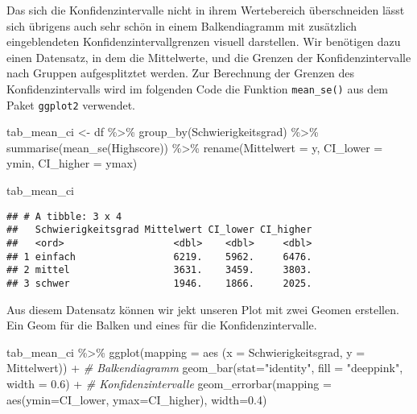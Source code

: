 \documentclass[
]{book}
\newenvironment{Shaded}{\begin{snugshade}}{\end{snugshade}}
\newcommand{\AttributeTok}[1]{\textcolor[rgb]{0.77,0.63,0.00}{#1}}
\newcommand{\CommentTok}[1]{\textcolor[rgb]{0.56,0.35,0.01}{\textit{#1}}}
\newcommand{\FloatTok}[1]{\textcolor[rgb]{0.00,0.00,0.81}{#1}}
\newcommand{\FunctionTok}[1]{\textcolor[rgb]{0.00,0.00,0.00}{#1}}
\newcommand{\NormalTok}[1]{#1}
\newcommand{\OtherTok}[1]{\textcolor[rgb]{0.56,0.35,0.01}{#1}}
\newcommand{\SpecialCharTok}[1]{\textcolor[rgb]{0.00,0.00,0.00}{#1}}
\newcommand{\StringTok}[1]{\textcolor[rgb]{0.31,0.60,0.02}{#1}}
\begin{document}
Das sich die Konfidenzintervalle nicht in ihrem Wertebereich überschneiden lässt sich übrigens auch sehr schön in einem Balkendiagramm mit zusätzlich eingeblendeten Konfidenzintervallgrenzen visuell darstellen. Wir benötigen dazu einen Datensatz, in dem die Mittelwerte, und die Grenzen der Konfidenzintervalle nach Gruppen aufgesplitztet werden. Zur Berechnung der Grenzen des Konfidenzintervalls wird im folgenden Code die Funktion \texttt{mean\_se()} aus dem Paket \texttt{ggplot2} verwendet.

\begin{Shaded}
\begin{Highlighting}[]
\NormalTok{tab\_mean\_ci }\OtherTok{\textless{}{-}}\NormalTok{ df }\SpecialCharTok{\%\textgreater{}\%} 
  \FunctionTok{group\_by}\NormalTok{(Schwierigkeitsgrad) }\SpecialCharTok{\%\textgreater{}\%}
  \FunctionTok{summarise}\NormalTok{(}\FunctionTok{mean\_se}\NormalTok{(Highscore)) }\SpecialCharTok{\%\textgreater{}\%} 
  \FunctionTok{rename}\NormalTok{(}\AttributeTok{Mittelwert =}\NormalTok{ y, }\AttributeTok{CI\_lower =}\NormalTok{ ymin, }\AttributeTok{CI\_higher =}\NormalTok{ ymax) }

\NormalTok{tab\_mean\_ci }
\end{Highlighting}
\end{Shaded}

\begin{verbatim}
## # A tibble: 3 x 4
##   Schwierigkeitsgrad Mittelwert CI_lower CI_higher
##   <ord>                   <dbl>    <dbl>     <dbl>
## 1 einfach                 6219.    5962.     6476.
## 2 mittel                  3631.    3459.     3803.
## 3 schwer                  1946.    1866.     2025.
\end{verbatim}

Aus diesem Datensatz können wir jekt unseren Plot mit zwei Geomen erstellen. Ein Geom für die Balken und eines für die Konfidenzintervalle.

\begin{Shaded}
\begin{Highlighting}[]
\NormalTok{tab\_mean\_ci }\SpecialCharTok{\%\textgreater{}\%}
  \FunctionTok{ggplot}\NormalTok{(}\AttributeTok{mapping =} \FunctionTok{aes}\NormalTok{ (}\AttributeTok{x =}\NormalTok{ Schwierigkeitsgrad, }\AttributeTok{y =}\NormalTok{ Mittelwert)) }\SpecialCharTok{+} 
  \CommentTok{\# Balkendiagramm}
  \FunctionTok{geom\_bar}\NormalTok{(}\AttributeTok{stat=}\StringTok{"identity"}\NormalTok{, }\AttributeTok{fill =} \StringTok{"deeppink"}\NormalTok{, }\AttributeTok{width =} \FloatTok{0.6}\NormalTok{) }\SpecialCharTok{+}
  \CommentTok{\# Konfidenzintervalle}
  \FunctionTok{geom\_errorbar}\NormalTok{(}\AttributeTok{mapping =} \FunctionTok{aes}\NormalTok{(}\AttributeTok{ymin=}\NormalTok{CI\_lower, }\AttributeTok{ymax=}\NormalTok{CI\_higher), }\AttributeTok{width=}\FloatTok{0.4}\NormalTok{)}
\end{Highlighting}
\end{Shaded}
\end{document}
